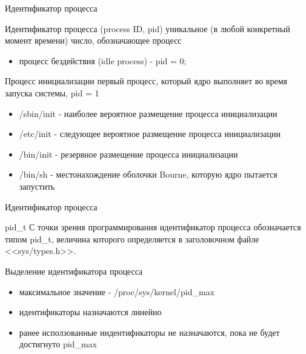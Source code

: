 \documentclass{beamer}
\begin{document}
\begin{frame}{Идентификатор процесса}
\begin{block}{Идентификатор процесса (process ID, pid)}
уникальное (в любой конкретный момент времени) число, обозначающее процесс
\end{block}
\begin{itemize}
\item процесс бездействия (idle process) - pid = 0;
\end{itemize}
\begin{block}{Процесс инициализации}
первый процесс, который ядро выполняет во время запуска системы, pid = 1
\end{block}
\begin{itemize}
\item /sbin/init - наиболее вероятное размещение процесса инициализации 
\item /etc/init - следующее вероятное размещение процесса инициализации
\item /bin/init - резервное размещение процесса инициализации
\item /bin/sh - местонахождение оболочки Bourne, которую ядро пытается запустить
\end{itemize}
\end{frame}

\begin{frame}{Идентификатор процесса}
\begin{block}{pid\_t}
С точки зрения программирования идентификатор процесса обозначается типом
pid\_t, величина которого определяется в заголовочном файле <<sys/types.h>>. 
\end{block}
Выделение идентификатора процесса
\begin{itemize}
\item максимальное значение - /proc/sys/kernel/pid\_max
\item идентификаторы назначаются линейно
\item ранее исползованные индентификаторы не назначаются, пока не будет достигнуто pid\_max 
\end{itemize}
\end{frame}
\end{document}
